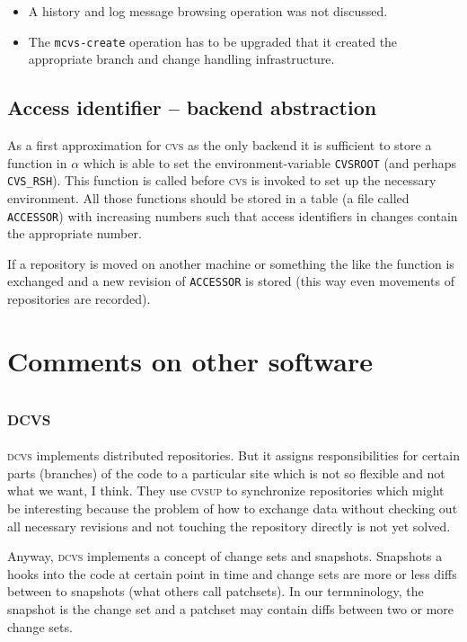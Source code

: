\documentclass[fleqn, 10pt, a4paper]{report}
\begin{document}
\begin{itemize}
\item A history and log message browsing operation was not
discussed.
\item The \texttt{mcvs-create} operation has to be upgraded that
it created the appropriate branch and change handling infrastructure.
\end{itemize}

\subsection{Access identifier -- backend abstraction}

As a first approximation for \textsc{cvs} as the only backend
it is sufficient to store a function in $\alpha$ which is able to
set the environment-variable \texttt{CVSROOT} (and perhaps
\texttt{CVS\_RSH}). This function is called before \textsc{cvs}
is invoked to set up the necessary environment.
All those functions should be stored in a table (a file called
\texttt{ACCESSOR}) with increasing numbers such that access
identifiers in changes contain the appropriate number.

If a repository is moved on another machine or something the like
the function is exchanged and a new revision of \texttt{ACCESSOR} is
stored (this way even movements of repositories are recorded).


\section{Comments on other software}

\subsection{\textsc{dcvs}}

\textsc{dcvs} implements distributed repositories. But it assigns
responsibilities for certain parts (branches) of the code to
a particular site which is not so flexible and not what we want, I think.
They use \textsc{cvsup} to synchronize repositories which might be
interesting because the problem of how to exchange data without checking
out all necessary revisions and not touching the repository directly is
not yet solved.
 
Anyway, \textsc{dcvs} implements a concept of change sets and snapshots.
Snapshots a hooks into the code at certain point in time and change sets
are more or less diffs between to snapshots (what others call patchsets).
In our termninology, the snapshot is the change set and a patchset may
contain diffs between two or more change sets.
\end{document}
